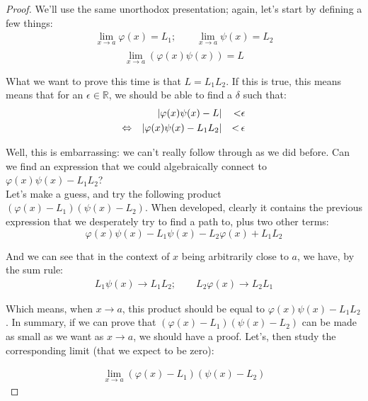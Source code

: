 \documentclass[solutions.tex]{subfiles}
\begin{document}
\begin{proof} We'll use the same unorthodox presentation; again,
let's start by defining a few things:
\begin{equation*} \begin{aligned}
	\lim_{x \rightarrow a}\varphi(x) = L_1;\qquad\lim_{x \rightarrow a}\psi(x) = L_2 \\
\end{aligned} \end{equation*}
\[	\lim_{x \rightarrow a}\left(\varphi(x)\psi(x)\right) = L \]

What we want to prove this time is that $L = L_1L_2$. If this
is true, this means means that for an $\epsilon\in\mathbb{R}$, we
should be able to find a $\delta$ such that:
\begin{equation*} \begin{aligned}
	~ && \lvert \varphi(x)\psi(x)-L \rvert &&<& \epsilon \\
	\Leftrightarrow && \lvert \varphi(x)\psi(x)-L_1L_2 \rvert &&<\,& \epsilon
\end{aligned} \end{equation*}

Well, this is embarrassing: we can't really follow through as we did
before. Can we find an expression that we could algebraically connect
to $\varphi(x)\psi(x)-L_1L_2$? \\

Let's make a guess, and try the following product $(\varphi(x)-L_1)(\psi(x)-L_2)$.
When developed, clearly it contains the previous expression that
we desperately try to find a path to, plus two other terms:
\[
	\varphi(x)\psi(x)-L_1\psi(x)-L_2\varphi(x)+L_1L_2
\]

And we can see that in the context of $x$ being arbitrarily close
to $a$, we have, by the sum rule:
\begin{equation*} \begin{aligned}
	L_1\psi(x) \rightarrow L_1L_2;\qquad L_2\varphi(x) \rightarrow L_2L_1
\end{aligned} \end{equation*}

Which means, when $x\rightarrow a$, this product should be equal to
$\varphi(x)\psi(x)-L_1L_2$. In summary, if we can prove that
$(\varphi(x)-L_1)(\psi(x)-L_2)$ can be made as small as we want as
$x\rightarrow a$, we should have a proof. Let's, then study the
corresponding limit (that we expect to be zero):

\begin{equation*} \begin{aligned}
	\lim_{x\rightarrow a}(\varphi(x)-L_1)(\psi(x)-L_2)
\end{aligned} \end{equation*}


\end{proof}
\end{document}
